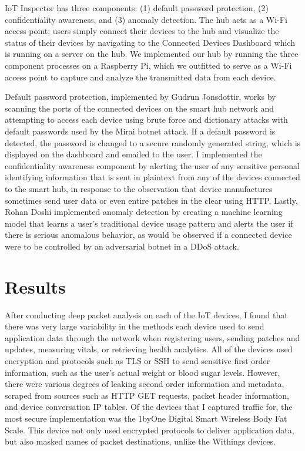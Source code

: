IoT Inspector has three components: (1) default password protection, (2) confidentiality awareness, and (3) anomaly detection. The hub acts as a Wi-Fi access point; users simply connect their devices to the hub and visualize the status of their devices by navigating to the Connected Devices Dashboard which is running on a server on the hub. We implemented our hub by running the three component processes on a Raspberry Pi, which we outfitted to serve as a Wi-Fi access point to capture and analyze the transmitted data from each device. 

 Default password protection, implemented by Gudrun Jonsdottir, works by scanning the ports of the connected devices on the smart hub network and attempting to access each device using brute force and dictionary attacks with default passwords used by the Mirai botnet attack. If a default password is detected, the password is changed to a secure randomly generated string, which is displayed on the dashboard and emailed to the user. I implemented the confidentiality awareness component by alerting the user of any sensitive personal identifying information that is sent in plaintext from any of the devices connected to the smart hub, in response to the observation that device manufactures sometimes send user data or even entire patches in the clear using HTTP. Lastly, Rohan Doshi implemented anomaly detection by creating a machine learning model that learns a user's traditional device usage pattern and alerts the user if there is serious anomalous behavior, as would be observed if a connected device were to be controlled by an adversarial botnet in a DDoS attack. 

\section{Results}

After conducting deep packet analysis on each of the IoT devices, I found that there was very large variability in the methods each device used to send application data through the network when registering users, sending patches and updates, measuring vitals, or retrieving health analytics. All of the devices used encryption and protocols such as TLS or SSH to send sensitive first order information, such as the user's actual weight or blood sugar levels. However, there were various degrees of leaking second order information and metadata, scraped from sources such as HTTP GET requests, packet header information, and device conversation IP tables. Of the devices that I captured traffic for, the most secure implementation was the 1byOne Digital Smart Wireless Body Fat Scale. This device not only used encrypted protocols to deliver application data, but also masked names of packet destinations, unlike the Withings devices. 

